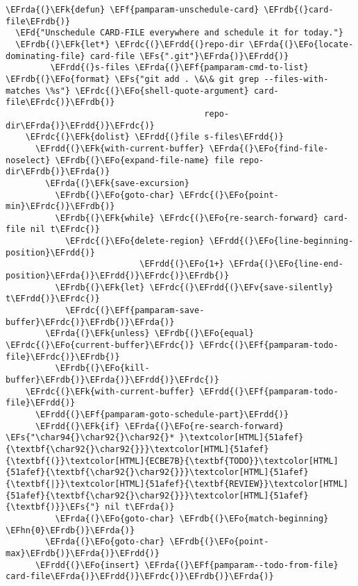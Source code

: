 \documentclass[a4wide,10pt]{article}
\newcommand{\EFs}[1]{\textcolor{EFs}{#1}} %
\newcommand{\EFd}[1]{\textcolor{EFd}{#1}} %
\newcommand{\EFk}[1]{\textcolor{EFk}{#1}} %
\newcommand{\EFf}[1]{\textcolor{EFf}{#1}} %
\newcommand{\EFv}[1]{\textcolor{EFv}{#1}} %
\newcommand{\EFo}[1]{\textcolor{EFo}{#1}} %
\newcommand{\EFhn}[1]{\textcolor{EFhn}{\textbf{#1}}} %
\newcommand{\EFrda}[1]{\textcolor{EFrda}{#1}} %
\newcommand{\EFrdb}[1]{\textcolor{EFrdb}{#1}} %
\newcommand{\EFrdc}[1]{\textcolor{EFrdc}{#1}} %
\newcommand{\EFrdd}[1]{\textcolor{EFrdd}{#1}} %
\begin{document}
\begin{Code}
\begin{Verbatim}
\EFrda{(}\EFk{defun} \EFf{pamparam-unschedule-card} \EFrdb{(}card-file\EFrdb{)}
  \EFd{"Unschedule CARD-FILE everywhere and schedule it for today."}
  \EFrdb{(}\EFk{let*} \EFrdc{(}\EFrdd{(}repo-dir \EFrda{(}\EFo{locate-dominating-file} card-file \EFs{".git"}\EFrda{)}\EFrdd{)}
         \EFrdd{(}s-files \EFrda{(}\EFf{pamparam-cmd-to-list} \EFrdb{(}\EFo{format} \EFs{"git add . \&\& git grep --files-with-matches \%s"} \EFrdc{(}\EFo{shell-quote-argument} card-file\EFrdc{)}\EFrdb{)}
                                        repo-dir\EFrda{)}\EFrdd{)}\EFrdc{)}
    \EFrdc{(}\EFk{dolist} \EFrdd{(}file s-files\EFrdd{)}
      \EFrdd{(}\EFk{with-current-buffer} \EFrda{(}\EFo{find-file-noselect} \EFrdb{(}\EFo{expand-file-name} file repo-dir\EFrdb{)}\EFrda{)}
        \EFrda{(}\EFk{save-excursion}
          \EFrdb{(}\EFo{goto-char} \EFrdc{(}\EFo{point-min}\EFrdc{)}\EFrdb{)}
          \EFrdb{(}\EFk{while} \EFrdc{(}\EFo{re-search-forward} card-file nil t\EFrdc{)}
            \EFrdc{(}\EFo{delete-region} \EFrdd{(}\EFo{line-beginning-position}\EFrdd{)}
                           \EFrdd{(}\EFo{1+} \EFrda{(}\EFo{line-end-position}\EFrda{)}\EFrdd{)}\EFrdc{)}\EFrdb{)}
          \EFrdb{(}\EFk{let} \EFrdc{(}\EFrdd{(}\EFv{save-silently} t\EFrdd{)}\EFrdc{)}
            \EFrdc{(}\EFf{pamparam-save-buffer}\EFrdc{)}\EFrdb{)}\EFrda{)}
        \EFrda{(}\EFk{unless} \EFrdb{(}\EFo{equal} \EFrdc{(}\EFo{current-buffer}\EFrdc{)} \EFrdc{(}\EFf{pamparam-todo-file}\EFrdc{)}\EFrdb{)}
          \EFrdb{(}\EFo{kill-buffer}\EFrdb{)}\EFrda{)}\EFrdd{)}\EFrdc{)}
    \EFrdc{(}\EFk{with-current-buffer} \EFrdd{(}\EFf{pamparam-todo-file}\EFrdd{)}
      \EFrdd{(}\EFf{pamparam-goto-schedule-part}\EFrdd{)}
      \EFrdd{(}\EFk{if} \EFrda{(}\EFo{re-search-forward} \EFs{"\char94{}\char92{}\char92{}* }\textcolor[HTML]{51afef}{\textbf{\char92{}\char92{}}}\textcolor[HTML]{51afef}{\textbf{(}}\textcolor[HTML]{ECBE7B}{\textbf{TODO}}\textcolor[HTML]{51afef}{\textbf{\char92{}\char92{}}}\textcolor[HTML]{51afef}{\textbf{|}}\textcolor[HTML]{51afef}{\textbf{REVIEW}}\textcolor[HTML]{51afef}{\textbf{\char92{}\char92{}}}\textcolor[HTML]{51afef}{\textbf{)}}\EFs{"} nil t\EFrda{)}
          \EFrda{(}\EFo{goto-char} \EFrdb{(}\EFo{match-beginning} \EFhn{0}\EFrdb{)}\EFrda{)}
        \EFrda{(}\EFo{goto-char} \EFrdb{(}\EFo{point-max}\EFrdb{)}\EFrda{)}\EFrdd{)}
      \EFrdd{(}\EFo{insert} \EFrda{(}\EFf{pamparam--todo-from-file} card-file\EFrda{)}\EFrdd{)}\EFrdc{)}\EFrdb{)}\EFrda{)}


\end{Verbatim}
\end{Code}
\end{document}
